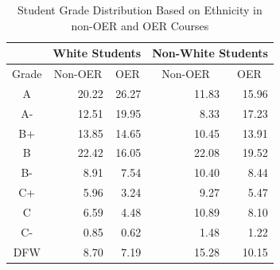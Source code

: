 \documentclass[11pt]{article}
\begin{document}
\begin{table}
\centering
\begin{tabular}{crrrr}
  & \multicolumn{2}{c}{White Students} & \multicolumn{2}{c}{Non-White Students} \\ \hline
  \multicolumn{1}{c}{Grade} & \multicolumn{1}{c}{Non-OER} & \multicolumn{1}{c}{OER} & \multicolumn{1}{c}{Non-OER} & \multicolumn{1}{c}{OER}\\ \hline
  A\hspace{1.1ex} & 20.22 & 26.27 & 11.83 & 15.96 \\
  A-\hspace{0.7ex} & 12.51 & 19.95 & 8.33 & 17.23 \\
  B+ & 13.85 & 14.65 & 10.45 & 13.91 \\
  B\hspace{1.1ex} & 22.42 & 16.05 & 22.08 & 19.52 \\
  B-\hspace{0.7ex} & 8.91 & 7.54 & 10.40 & 8.44 \\
  C+ & 5.96 & 3.24 & 9.27 & 5.47 \\
  C\hspace{1.1ex} & 6.59 & 4.48 & 10.89 & 8.10 \\
  C-\hspace{0.8ex} & 0.85 & 0.62 & 1.48 & 1.22 \\
  DFW & 8.70 & 7.19 & 15.28 & 10.15 \\ \hline
\end{tabular}
\caption{Student Grade Distribution Based on Ethnicity in non-OER and OER Courses \cite{CB-WC-PH:18}}
\end{table}
\end{document}
